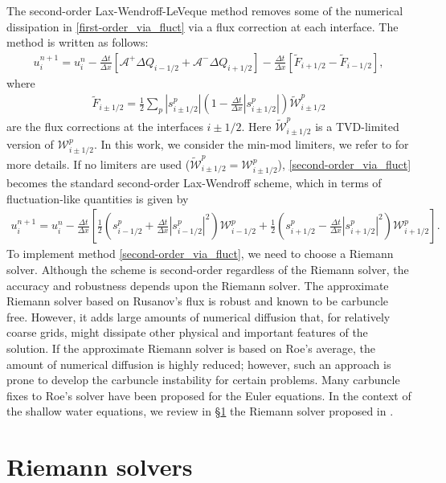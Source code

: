 \documentclass[preprint, 11pt]{article}
\newcommand{\W}{{\mathcal W}}
\newcommand{\A}{{\mathcal A}}
\begin{document}
The second-order Lax-Wendroff-LeVeque method removes some of the numerical dissipation in
\eqref{first-order_via_fluct} via a flux correction at each interface. The method is written as follows:
\begin{align}\label{second-order_via_fluct}
  u_i^{n+1} = u_i^n-\frac{\Delta t}{\Delta x}\left[\A^+\Delta Q_{i-1/2}+\A^-\Delta Q_{i+1/2}\right]
  -\frac{\Delta t}{\Delta x}\left[\tilde{F}_{i+1/2}-\tilde{F}_{i-1/2}\right],
\end{align}
where
\begin{align*}
  \tilde{F}_{i\pm 1/2}=\frac{1}{2}\sum_p|s_{i\pm 1/2}^p|\left(1-\frac{\Delta t}{\Delta x}|s_{i\pm 1/2}^p|\right)\tilde\W_{i\pm 1/2}^p
\end{align*}
are the flux corrections at the interfaces $i\pm 1/2$. Here $\tilde{\W}_{i\pm 1/2}^p$ is a
TVD-limited version of $\W_{i\pm 1/2}^p$.
In this work, we consider the min-mod limiters, we refer to \cite{leveque1997wave} for more details.
If no limiters are used
($\tilde \W_{i\pm 1/2}^p = \W_{i\pm 1/2}^p$), \eqref{second-order_via_fluct} becomes
the standard second-order Lax-Wendroff scheme, which in terms of fluctuation-like quantities
is given by
\begin{align*}
  u_i^{n+1}=u_i^n-\frac{\Delta t}{\Delta x}
\left[
  \frac{1}{2}\left(s_{i-1/2}^p+\frac{\Delta t}{\Delta x}|s_{i-1/2}^p|^2\right)\W_{i-1/2}^p
  +
  \frac{1}{2}\left(s_{i+1/2}^p-\frac{\Delta t}{\Delta x}|s_{i+1/2}^p|^2\right)\W_{i+1/2}^p
\right].
\end{align*}
To implement method \eqref{second-order_via_fluct},
we need to choose a Riemann solver. Although the scheme is second-order
regardless of the Riemann solver, the accuracy and robustness depends upon the
Riemann solver. The approximate Riemann solver based on Rusanov's flux is robust and known to be carbuncle free.
However, it adds large amounts of numerical diffusion that, for relatively coarse grids,
might dissipate other physical and important features of the solution. If the approximate Riemann solver
is based on Roe's average, the amount of numerical diffusion is highly reduced; however,
such an approach is prone to develop the carbuncle instability for certain problems.
Many carbuncle fixes to Roe's solver have been proposed for the Euler equations.
In the context of the shallow water equations, we review in \S\ref{sec:riemann_solvers}
the Riemann solver proposed in \cite{kemm2014note}.

\section{Riemann solvers}\label{sec:riemann_solvers}
\end{document}
